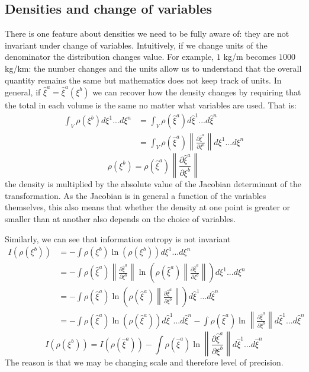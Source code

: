 \documentclass[11pt]{article}
\begin{document}
\subsection*{Densities and change of variables}

There is one feature about densities we need to be fully aware of: they are not invariant under change of variables. Intuitively, if we change units of the denominator the distribution changes value. For example, $1$ kg/m becomes $1000$ kg/km: the number changes and the units allow us to understand that the overall quantity remains the same but mathematics does not keep track of units. In general, if $\hat{\xi}^a=\hat{\xi}^a(\xi^b)$ we can recover how the density changes by requiring that the total in each volume is the same no matter what variables are used. That is:
\begin{align*}
\int_V \rho(\xi^b) d\xi^1 ... d\xi^n &= \int_V \rho(\hat{\xi}^a) d\hat{\xi}^1 ... d\hat{\xi}^n \\
&=\int_V\rho(\hat{\xi}^a) \left\|\frac{\partial \hat{\xi}^a}{\partial \xi^b}\right\| d\xi^1 ... d\xi^n
\end{align*}
\begin{equation}\label{density_transformation}
\rho(\xi^b) = \rho(\hat{\xi}^a) \left\|\frac{\partial \hat{\xi}^a}{\partial \xi^b}\right\|
\end{equation}
the density is multiplied by the absolute value of the Jacobian determinant of the transformation. As the Jacobian is in general a function of the variables themselves, this also means that whether the density at one point is greater or smaller than at another also depends on the choice of variables.

Similarly, we can see that information entropy is not invariant
\begin{align*}
I(\rho(\xi^b)) &=-\int \rho(\xi^b) \ln (\rho(\xi^b)) d\xi^1 ... d\xi^n \\
&=-\int \rho(\hat{\xi}^a) \left\|\frac{\partial \hat{\xi}^a}{\partial \xi^b}\right\| \ln \left(\rho(\hat{\xi}^a) \left\|\frac{\partial \hat{\xi}^a}{\partial \xi^b}\right\|\right) d\xi^1 ... d\xi^n \\
&=-\int \rho(\hat{\xi}^a) \ln \left(\rho(\hat{\xi}^a) \left\|\frac{\partial \hat{\xi}^a}{\partial \xi^b}\right\|\right) d\hat{\xi}^1 ... d\hat{\xi}^n \\
&=-\int \rho(\hat{\xi}^a) \ln (\rho(\hat{\xi}^a)) d\hat{\xi}^1 ... d\hat{\xi}^n -\int \rho(\hat{\xi}^a) \ln \left\|\frac{\partial \hat{\xi}^a}{\partial \xi^b}\right\| d\hat{\xi}^1 ... d\hat{\xi}^n
\end{align*}
\begin{equation}\label{entropy_transformation}
I(\rho(\xi^b)) =I(\rho(\hat{\xi}^a)) -\int \rho(\hat{\xi}^a) \ln \left\|\frac{\partial \hat{\xi}^a}{\partial \xi^b}\right\| d\hat{\xi}^1 ... d\hat{\xi}^n
\end{equation}
The reason is that we may be changing scale and therefore level of precision.
\end{document}
